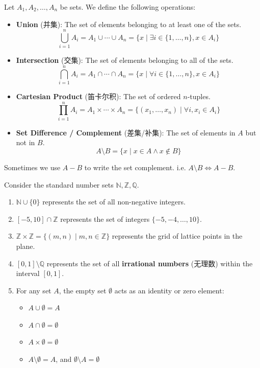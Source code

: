 \documentclass[
	UTF-8,
	11pt, %
	a4paper, %
]{LegrandOrangeBook}
\begin{document}
\begin{definition}
Let $A_1, A_2, \dots, A_n$ be sets. We define the following operations:
\begin{itemize}
    \item \textbf{Union} (并集): The set of elements belonging to at least one of the sets.
    \[ \bigcup_{i=1}^n A_i = A_1 \cup \cdots \cup A_n = \{ x \mid \exists i \in \{1,\dots,n\}, x \in A_i \} \]
    
    \item \textbf{Intersection} (交集): The set of elements belonging to all of the sets.
    \[ \bigcap_{i=1}^n A_i = A_1 \cap \cdots \cap A_n = \{ x \mid \forall i \in \{1,\dots,n\}, x \in A_i \} \]
    
    \item \textbf{Cartesian Product} (笛卡尔积): The set of ordered $n$-tuples.
    \[ \prod_{i=1}^n A_i = A_1 \times \cdots \times A_n = \{ (x_1, \dots, x_n) \mid \forall i, x_i \in A_i \} \]
    
    \item \textbf{Set Difference / Complement} (差集/补集): The set of elements in $A$ but not in $B$.
    \[ A \setminus B = \{ x \mid x \in A \land x \notin B \} \]
\end{itemize}
\end{definition}

\begin{remark}
	Sometimes we use $A-B$ to write the set complement. i.e. $A\setminus B \iff A-B$.
\end{remark}

\begin{example}
Consider the standard number sets $\mathbb{N}, \mathbb{Z}, \mathbb{Q}$.
\begin{enumerate}
    \item $\mathbb{N} \cup \{0\}$ represents the set of all non-negative integers.
    \item $[-5, 10] \cap \mathbb{Z}$ represents the set of integers $\{-5, -4, \dots, 10\}$.
    \item $\mathbb{Z} \times \mathbb{Z} = \{ (m, n) \mid m, n \in \mathbb{Z} \}$ represents the grid of lattice points in the plane.
    \item $[0, 1] \setminus \mathbb{Q}$ represents the set of all \textbf{irrational numbers} (无理数) within the interval $[0, 1]$.
    \item For any set $A$, the empty set $\emptyset$ acts as an identity or zero element:
    \begin{itemize}
        \item $A \cup \emptyset = A$
        \item $A \cap \emptyset = \emptyset$
        \item $A \times \emptyset = \emptyset$
        \item $A \setminus \emptyset = A$, and $\emptyset \setminus A = \emptyset$
    \end{itemize}
\end{enumerate}
\end{example}
\end{document}
